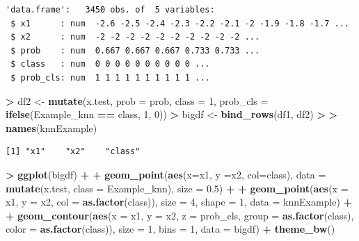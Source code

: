\documentclass[
]{krantz}
\makeatletter
\newenvironment{Shaded}{\begin{snugshade}}{\end{snugshade}}
\newcommand{\DataTypeTok}[1]{\textcolor[rgb]{0.27,0.27,0.27}{#1}}
\newcommand{\DecValTok}[1]{\textcolor[rgb]{0.06,0.06,0.06}{#1}}
\newcommand{\ErrorTok}[1]{\textcolor[rgb]{0.14,0.14,0.14}{\textbf{#1}}}
\newcommand{\FloatTok}[1]{\textcolor[rgb]{0.06,0.06,0.06}{#1}}
\newcommand{\KeywordTok}[1]{\textcolor[rgb]{0.27,0.27,0.27}{\textbf{#1}}}
\newcommand{\NormalTok}[1]{#1}
\newcommand{\OperatorTok}[1]{\textcolor[rgb]{0.43,0.43,0.43}{\textbf{#1}}}
\newcommand{\StringTok}[1]{\textcolor[rgb]{0.5,0.5,0.5}{#1}}
\newenvironment{kframe}{%
\medskip{}
\setlength{\fboxsep}{.8em}
 \def\at@end@of@kframe{}%
 \ifinner\ifhmode%
  \def\at@end@of@kframe{\end{minipage}}%
  \begin{minipage}{\columnwidth}%
 \fi\fi%
 \def\FrameCommand##1{\hskip\@totalleftmargin \hskip-\fboxsep
 \colorbox{shadecolor}{##1}\hskip-\fboxsep
     \hskip-\linewidth \hskip-\@totalleftmargin \hskip\columnwidth}%
 \MakeFramed {\advance\hsize-\width
   \@totalleftmargin\z@ \linewidth\hsize
   \@setminipage}}%
 {\par\unskip\endMakeFramed%
 \at@end@of@kframe}
\renewenvironment{Shaded}{\begin{kframe}}{\end{kframe}}
\makeatother
\begin{document}
\begin{verbatim}
'data.frame':   3450 obs. of  5 variables:
 $ x1      : num  -2.6 -2.5 -2.4 -2.3 -2.2 -2.1 -2 -1.9 -1.8 -1.7 ...
 $ x2      : num  -2 -2 -2 -2 -2 -2 -2 -2 -2 -2 ...
 $ prob    : num  0.667 0.667 0.667 0.733 0.733 ...
 $ class   : num  0 0 0 0 0 0 0 0 0 0 ...
 $ prob_cls: num  1 1 1 1 1 1 1 1 1 1 ...
\end{verbatim}

\begin{Shaded}
\begin{Highlighting}[]
\OperatorTok{\textgreater{}}\StringTok{ }\NormalTok{df2 \textless{}{-}}\StringTok{ }\KeywordTok{mutate}\NormalTok{(x.test, }\DataTypeTok{prob =}\NormalTok{ prob, }\DataTypeTok{class =} \DecValTok{1}\NormalTok{,  }\DataTypeTok{prob\_cls =} \KeywordTok{ifelse}\NormalTok{(Example\_knn }\OperatorTok{==}\StringTok{ }\NormalTok{class, }\DecValTok{1}\NormalTok{, }\DecValTok{0}\NormalTok{))}
\OperatorTok{\textgreater{}}\StringTok{ }\NormalTok{bigdf \textless{}{-}}\StringTok{ }\KeywordTok{bind\_rows}\NormalTok{(df1, df2)}
\OperatorTok{\textgreater{}}\StringTok{ }
\ErrorTok{\textgreater{}}\StringTok{ }\KeywordTok{names}\NormalTok{(knnExample)}
\end{Highlighting}
\end{Shaded}

\begin{verbatim}
[1] "x1"    "x2"    "class"
\end{verbatim}

\begin{Shaded}
\begin{Highlighting}[]
\OperatorTok{\textgreater{}}\StringTok{ }\KeywordTok{ggplot}\NormalTok{(bigdf) }\OperatorTok{+}\StringTok{ }
\OperatorTok{+}\StringTok{    }\KeywordTok{geom\_point}\NormalTok{(}\KeywordTok{aes}\NormalTok{(}\DataTypeTok{x=}\NormalTok{x1, }\DataTypeTok{y =}\NormalTok{x2, }\DataTypeTok{col=}\NormalTok{class), }\DataTypeTok{data =} \KeywordTok{mutate}\NormalTok{(x.test, }\DataTypeTok{class =}\NormalTok{ Example\_knn), }\DataTypeTok{size =} \FloatTok{0.5}\NormalTok{) }\OperatorTok{+}\StringTok{ }
\OperatorTok{+}\StringTok{    }\KeywordTok{geom\_point}\NormalTok{(}\KeywordTok{aes}\NormalTok{(}\DataTypeTok{x =}\NormalTok{ x1, }\DataTypeTok{y =}\NormalTok{ x2, }\DataTypeTok{col =} \KeywordTok{as.factor}\NormalTok{(class)), }\DataTypeTok{size =} \DecValTok{4}\NormalTok{, }\DataTypeTok{shape =} \DecValTok{1}\NormalTok{, }\DataTypeTok{data =}\NormalTok{ knnExample) }\OperatorTok{+}\StringTok{ }
\OperatorTok{+}\StringTok{    }\KeywordTok{geom\_contour}\NormalTok{(}\KeywordTok{aes}\NormalTok{(}\DataTypeTok{x =}\NormalTok{ x1, }\DataTypeTok{y =}\NormalTok{ x2, }\DataTypeTok{z =}\NormalTok{ prob\_cls, }\DataTypeTok{group =} \KeywordTok{as.factor}\NormalTok{(class), }\DataTypeTok{color =} \KeywordTok{as.factor}\NormalTok{(class)), }\DataTypeTok{size =} \DecValTok{1}\NormalTok{, }\DataTypeTok{bins =} \DecValTok{1}\NormalTok{, }\DataTypeTok{data =}\NormalTok{ bigdf) }\OperatorTok{+}\StringTok{ }\KeywordTok{theme\_bw}\NormalTok{()}
\end{Highlighting}
\end{Shaded}
\end{document}
